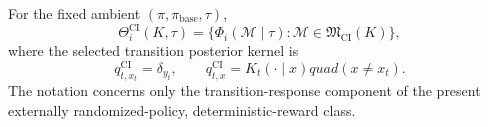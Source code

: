 For the fixed ambient \((\pi,\pi_{\mathrm{base}},\tau)\),
\[
 \Theta_i^{\mathrm{CI}}(K,\tau)
 =\{\Phi_i(\mathcal M\mid\tau):\mathcal M\in\mathfrak M_{\mathrm{CI}}(K)\},
\]
where the selected transition posterior kernel is
\[
 q_{t,x_t}^{\mathrm{CI}}=\delta_{y_t},
 \qquad
 q_{t,x}^{\mathrm{CI}}=K_t(\cdot\mid x)quad(x\ne x_t).
\]
The notation concerns only the transition-response component of the present externally randomized-policy, deterministic-reward class.